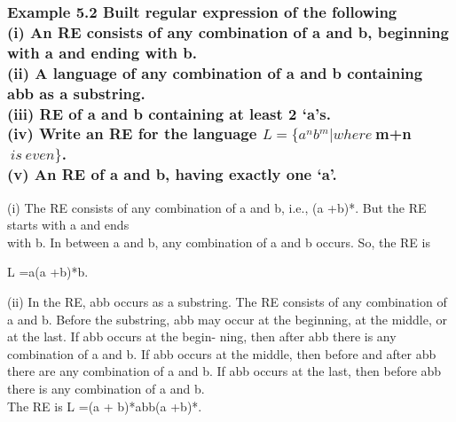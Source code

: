 	\begin{frame}
		
			\frametitle{Example 5.2 
			\textnormal{\small Built regular expression of the following\\\vspace{3mm}
\noindent\!\!\!\!\!\!\!\!\!\!(i)	An RE consists of any combination of a and b, beginning with a and ending with b.\\\vspace{3mm}
\noindent\!\!\!\!\!\!\!\!\!\!(ii)	A language of any combination of a and b containing abb as a substring.\\\vspace{3mm}
\noindent\!\!\!\!\!\!\!\!\!\!(iii)	RE of a and b containing at least 2 ‘a’s.\\\vspace{3mm}
\noindent\!\!\!\!\!\!\!\!\!\!(iv)	Write an RE for the language $L =\{a^nb^m | where \ $m+n$ \ is\ even\}$.\\\vspace{3mm}
\noindent\!\!\!\!\!\!\!\!\!\!(v)	An RE of a and b, having exactly one ‘a’.}
		}
		
	\end{frame}	
	\begin{frame}
		
\!\!\!\!\!\!\!\!\!\!\!\!\!\!\!\!\!\!\!\!\begin{solution}

\noindent\!\!\!\!\!\!\!\!\!\!(i)	The RE consists of any combination of a and b, i.e., (a +b)*. But the RE starts with a and ends\\ with b. In between a and b, any combination of a and b occurs. So, the RE is\\
\begin{center}
L =a(a +b)*b.
\end{center}
\end{solution}
		
	\end{frame}	
	\begin{frame}
		
\!\!\!\!\!\!\!\!\!\!\!\!\!\!\!\!\!\!\!\!\begin{solution}
\noindent\!\!\!\!\!\!\!\!\!\!(ii)	In the RE, abb occurs as a substring. The RE consists of any combination of a and b. Before the substring, abb may occur at the beginning, at the middle, or at the last. If abb occurs at the begin- ning, then after abb there is any combination of a and b. If abb occurs at the middle, then before and after abb there are any combination of a and b. If abb occurs at the last, then before abb there is any combination of a and b.\\
The RE is L =(a + b)*abb(a +b)*.

\end{solution}
		
	\end{frame}	

